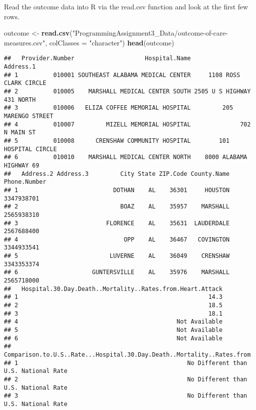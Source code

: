 \documentclass[
]{article}
\newenvironment{Shaded}{\begin{snugshade}}{\end{snugshade}}
\newcommand{\AttributeTok}[1]{\textcolor[rgb]{0.13,0.29,0.53}{#1}}
\newcommand{\FunctionTok}[1]{\textcolor[rgb]{0.13,0.29,0.53}{\textbf{#1}}}
\newcommand{\NormalTok}[1]{#1}
\newcommand{\OtherTok}[1]{\textcolor[rgb]{0.56,0.35,0.01}{#1}}
\newcommand{\StringTok}[1]{\textcolor[rgb]{0.31,0.60,0.02}{#1}}
\begin{document}
Read the outcome data into R via the read.csv function and look at the
first few rows.

\begin{Shaded}
\begin{Highlighting}[]
\NormalTok{outcome }\OtherTok{\textless{}{-}} \FunctionTok{read.csv}\NormalTok{(}\StringTok{"ProgrammingAssignment3\_Data/outcome{-}of{-}care{-}measures.csv"}\NormalTok{, }\AttributeTok{colClasses =} \StringTok{"character"}\NormalTok{)}
\FunctionTok{head}\NormalTok{(outcome)}
\end{Highlighting}
\end{Shaded}

\begin{verbatim}
##   Provider.Number                    Hospital.Name                  Address.1
## 1          010001 SOUTHEAST ALABAMA MEDICAL CENTER     1108 ROSS CLARK CIRCLE
## 2          010005    MARSHALL MEDICAL CENTER SOUTH 2505 U S HIGHWAY 431 NORTH
## 3          010006   ELIZA COFFEE MEMORIAL HOSPITAL         205 MARENGO STREET
## 4          010007         MIZELL MEMORIAL HOSPITAL              702 N MAIN ST
## 5          010008      CRENSHAW COMMUNITY HOSPITAL        101 HOSPITAL CIRCLE
## 6          010010    MARSHALL MEDICAL CENTER NORTH    8000 ALABAMA HIGHWAY 69
##   Address.2 Address.3         City State ZIP.Code County.Name Phone.Number
## 1                           DOTHAN    AL    36301     HOUSTON   3347938701
## 2                             BOAZ    AL    35957    MARSHALL   2565938310
## 3                         FLORENCE    AL    35631  LAUDERDALE   2567688400
## 4                              OPP    AL    36467   COVINGTON   3344933541
## 5                          LUVERNE    AL    36049    CRENSHAW   3343353374
## 6                     GUNTERSVILLE    AL    35976    MARSHALL   2565718000
##   Hospital.30.Day.Death..Mortality..Rates.from.Heart.Attack
## 1                                                      14.3
## 2                                                      18.5
## 3                                                      18.1
## 4                                             Not Available
## 5                                             Not Available
## 6                                             Not Available
##   Comparison.to.U.S..Rate...Hospital.30.Day.Death..Mortality..Rates.from.Heart.Attack
## 1                                                No Different than U.S. National Rate
## 2                                                No Different than U.S. National Rate
## 3                                                No Different than U.S. National Rate

\end{verbatim}
\end{document}

